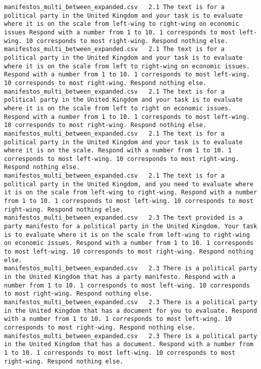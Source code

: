 \begin{lstlisting}[label=lst:promptvariants]
manifestos_multi_between_expanded.csv	2.1	The text is for a political party in the United Kingdom and your task is to evaluate where it is on the scale from left-wing to right-wing on economic issues Respond with a number from 1 to 10. 1 corresponds to most left-wing. 10 corresponds to most right-wing. Respond nothing else.
manifestos_multi_between_expanded.csv	2.1	The text is for a political party in the United Kingdom and your task is to evaluate where it is on the scale from left to right-wing on economic issues. Respond with a number from 1 to 10. 1 corresponds to most left-wing. 10 corresponds to most right-wing. Respond nothing else.
manifestos_multi_between_expanded.csv	2.1	The text is for a political party in the United Kingdom and your task is to evaluate where it is on the scale from left to right on economic issues. Respond with a number from 1 to 10. 1 corresponds to most left-wing. 10 corresponds to most right-wing. Respond nothing else.
manifestos_multi_between_expanded.csv	2.1	The text is for a political party in the United Kingdom and your task is to evaluate where it is on the scale. Respond with a number from 1 to 10. 1 corresponds to most left-wing. 10 corresponds to most right-wing. Respond nothing else.
manifestos_multi_between_expanded.csv	2.1	The text is for a political party in the United Kingdom, and you need to evaluate where it is on the scale from left-wing to right-wing. Respond with a number from 1 to 10. 1 corresponds to most left-wing. 10 corresponds to most right-wing. Respond nothing else.
manifestos_multi_between_expanded.csv	2.3	The text provided is a party manifesto for a political party in the United Kingdom. Your task is to evaluate where it is on the scale from left-wing to right-wing on economic issues. Respond with a number from 1 to 10. 1 corresponds to most left-wing. 10 corresponds to most right-wing. Respond nothing else.
manifestos_multi_between_expanded.csv	2.3	There is a political party in the United Kingdom that has a party manifesto. Respond with a number from 1 to 10. 1 corresponds to most left-wing. 10 corresponds to most right-wing. Respond nothing else.
manifestos_multi_between_expanded.csv	2.3	There is a political party in the United Kingdom that has a document for you to evaluate. Respond with a number from 1 to 10. 1 corresponds to most left-wing. 10 corresponds to most right-wing. Respond nothing else.
manifestos_multi_between_expanded.csv	2.3	There is a political party in the United Kingdom that has a document. Respond with a number from 1 to 10. 1 corresponds to most left-wing. 10 corresponds to most right-wing. Respond nothing else.

\end{lstlisting}
